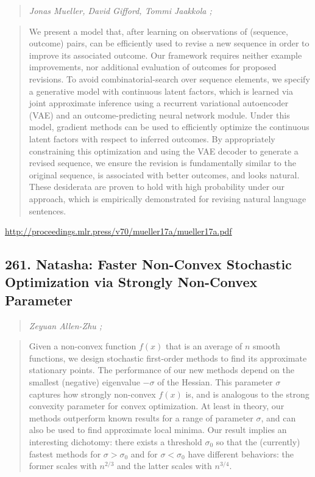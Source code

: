 \documentclass{article}
\begin{document}
\begin{quote}
\footnotesize{\textit{Jonas Mueller, David Gifford, Tommi Jaakkola ;}}

\end{quote}

\begin{quote}
    We present a model that, after learning on observations of (sequence, outcome) pairs, can be efficiently used to revise a new sequence in order to improve its associated outcome. Our framework requires neither example improvements, nor additional evaluation of outcomes for proposed revisions. To avoid combinatorial-search over sequence elements, we specify a generative model with continuous latent factors, which is learned via joint approximate inference using a recurrent variational autoencoder (VAE) and an outcome-predicting neural network module. Under this model, gradient methods can be used to efficiently optimize the continuous latent factors with respect to inferred outcomes. By appropriately constraining this optimization and using the VAE decoder to generate a revised sequence, we ensure the revision is fundamentally similar to the original sequence, is associated with better outcomes, and looks natural. These desiderata are proven to hold with high probability under our approach, which is empirically demonstrated for revising natural language sentences.  
\end{quote}

\href{http://proceedings.mlr.press/v70/mueller17a/mueller17a.pdf}{http://proceedings.mlr.press/v70/mueller17a/mueller17a.pdf}

\subsection{261. Natasha: Faster Non-Convex Stochastic Optimization via Strongly Non-Convex Parameter}

\begin{quote}
\footnotesize{\textit{Zeyuan Allen-Zhu ;}}

\end{quote}

\begin{quote}
    Given a non-convex function $f(x)$ that is an average of $n$ smooth functions, we design stochastic first-order methods to find its approximate stationary points. The performance of our new methods depend on the smallest (negative) eigenvalue $-\sigma$ of the Hessian. This parameter $\sigma$ captures how strongly non-convex $f(x)$ is, and is analogous to the strong convexity parameter for convex optimization. At least in theory, our methods outperform known results for a range of parameter $\sigma$, and can also be used to find approximate local minima. Our result implies an interesting dichotomy: there exists a threshold $\sigma_0$ so that the (currently) fastest methods for $\sigma>\sigma_0$ and for $\sigma<\sigma_0$ have different behaviors: the former scales with $n^{2/3}$ and the latter scales with $n^{3/4}$.  
\end{quote}
\end{document}
